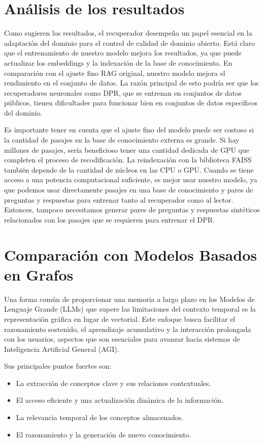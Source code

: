 \documentclass{article}
\begin{document}
\section{Análisis de los resultados}

Como sugieren los resultados, el recuperador desempeña un papel esencial en la adaptación del dominio para el control de calidad de dominio abierto. Está claro que el entrenamiento de nuestro modelo mejora los resultados, ya que puede actualizar los embeddings y la indexación de la base de conocimiento. En comparación con el ajuste fino RAG original, nuestro modelo mejora el rendimiento en el conjunto de datos. La razón principal de esto podría ser que los recuperadores neuronales como DPR, que se entrenan en conjuntos de datos públicos, tienen dificultades para funcionar bien en conjuntos de datos específicos del dominio.

Es importante tener en cuenta que el ajuste fino del modelo puede ser costoso si la cantidad de pasajes en la base de conocimiento externa es grande. Si hay millones de pasajes, sería beneficioso tener una cantidad dedicada de GPU que completen el proceso de recodificación. La reindexación con la biblioteca FAISS también depende de la cantidad de núcleos en las CPU o GPU. Cuando se tiene acceso a una potencia computacional suficiente, es mejor usar nuestro modelo, ya que podemos usar directamente pasajes en una base de conocimiento y pares de preguntas y respuestas para entrenar tanto al recuperador como al lector. Entonces, tampoco necesitamos generar pares de preguntas y respuestas sintéticos relacionados con los pasajes que se requieren para entrenar el DPR.


\section{Comparación con Modelos Basados en Grafos}

Una forma común de proporcionar una memoria a largo plazo en los Modelos de Lenguaje Grande (LLMs) que supere las limitaciones del contexto temporal es la representación gráfica en lugar de vectorial. Este enfoque busca facilitar el razonamiento sostenido, el aprendizaje acumulativo y la interacción prolongada con los usuarios, aspectos que son esenciales para avanzar hacia sistemas de Inteligencia Artificial General (AGI).

Sus principales puntos fuertes son:
\begin{itemize}
    \item La extracción de conceptos clave y sus relaciones contextuales.
    \item El acceso eficiente y una actualización dinámica de la información.
    \item La relevancia temporal de los conceptos almacenados.
    \item El razonamiento y la generación de nuevo conocimiento.
\end{itemize}
\end{document}
